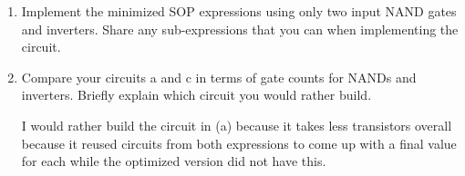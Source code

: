 \documentclass{article}
\begin{document}
\begin{enumerate}
\begin{enumerate}
\begin{center}
        \end{center}
        \item Implement  the  minimized  SOP expressions  using  only  two  input NAND  gates  and  inverters.  Share  any  sub-expressions  that  you  can  when implementing the circuit.
        \begin{center}
        \end{center}
        \item Compare your circuits a and c in terms of gate counts for NANDs and inverters.  Briefly explain which circuit you would rather build.
        \begin{center}
            I would rather build the circuit in (a) because it takes less transistors overall because it reused circuits from both expressions to come up with a final value for each while the optimized version did not have this.
        \end{center}
    \end{enumerate}
\end{enumerate}
\end{document}
